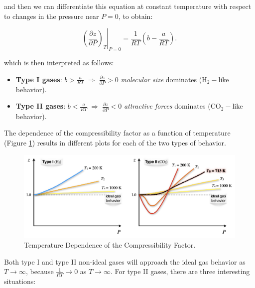 \documentclass[
  9pt,
]{extbook}
\providecommand{\tightlist}{%
  \setlength{\itemsep}{0pt}\setlength{\parskip}{0pt}}
\theoremstyle{definition}
\theoremstyle{definition}
\theoremstyle{definition}
\theoremstyle{remark}
\begin{document}
and then we can differentiate this equation at constant temperature with respect to changes in the pressure near \(P=0\), to obtain:

\begin{equation}
\left. \left( \frac{\partial z}{\partial P}\right)_T \right|_{P=0} = \frac{1}{RT} \left( b -\frac{a}{RT} \right).
\label{eq:compr2}
\end{equation}

which is then interpreted as follows:

\begin{itemize}
\tightlist
\item
  \textbf{Type I gases}: \(b>\frac{a}{RT} \; \Rightarrow \; \frac{\partial z}{\partial P} > 0\) \emph{molecular size} dominates (\(\mathrm{H}_2-\)like behavior).
\item
  \textbf{Type II gases}: \(b<\frac{a}{RT} \; \Rightarrow \; \frac{\partial z}{\partial P} < 0\) \emph{attractive forces} dominates (\(\mathrm{CO}_2-\)like behavior).
\end{itemize}

The dependence of the compressibility factor as a function of temperature (Figure \ref{fig:Fig1Zb2}) results in different plots for each of the two types of behavior.

\begin{figure}

{\centering \includegraphics[width=0.9\linewidth]{./img/OEP_Figures.013} 

}

\caption{Temperature Dependence of the Compressibility Factor.}\label{fig:Fig1Zb2}
\end{figure}

Both type I and type II non-ideal gases will approach the ideal gas behavior as \(T\rightarrow \infty\), because \(\frac{1}{RT}\rightarrow 0\) as \(T\rightarrow \infty\). For type II gases, there are three interesting situations:
\end{document}
